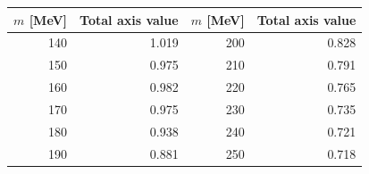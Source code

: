 \begin{tabular}{rrrr}
\toprule
$m$ [MeV] & Total axis value & $m$ [MeV] & Total axis value \\
\midrule
140 & 1.019 & 200 & 0.828 \\
150 & 0.975 & 210 & 0.791 \\
160 & 0.982 & 220 & 0.765 \\
170 & 0.975 & 230 & 0.735 \\
180 & 0.938 & 240 & 0.721 \\
190 & 0.881 & 250 & 0.718 \\
\bottomrule
\end{tabular}
